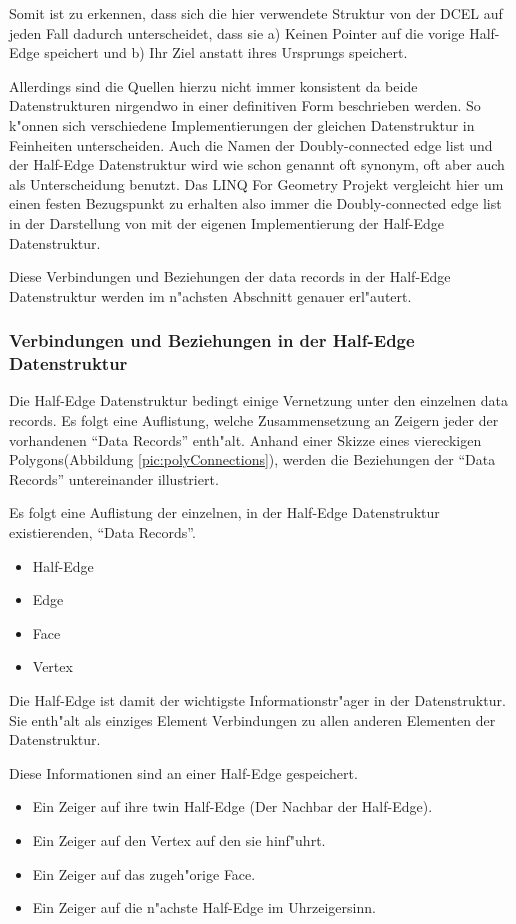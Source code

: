 \documentclass[pagesize, paper=a4, fontsize=12pt,titlepage=true, headings=small, headnosepline, abstractoff, liststotoc, nochapterprefix, plainheadsepline]{scrreprt}
\newcommand{\LFGS}{LINQ For Geometry }
\newcommand{\HES}{Half-Edge Datenstruktur }
\begin{document}
Somit ist zu erkennen, dass sich die hier verwendete Struktur von der DCEL auf jeden Fall dadurch unterscheidet, dass sie a) Keinen Pointer auf die vorige Half-Edge speichert und b) Ihr Ziel anstatt ihres Ursprungs speichert.

Allerdings sind die Quellen hierzu nicht immer konsistent da beide Datenstrukturen nirgendwo in einer definitiven Form beschrieben werden. So k"onnen sich verschiedene Implementierungen der gleichen Datenstruktur in Feinheiten unterscheiden. Auch die Namen der Doubly-connected edge list und der \HES wird wie schon genannt oft synonym, oft aber auch als Unterscheidung benutzt. Das \LFGS Projekt vergleicht hier um einen festen Bezugspunkt zu erhalten also immer die Doubly-connected edge list in der Darstellung von \cite[S.~30 und Folgende]{vanMarkdeBerg.2008} mit der eigenen Implementierung der Half-Edge Datenstruktur.

Diese Verbindungen und Beziehungen der data records in der \HES werden im n"achsten Abschnitt genauer erl"autert.

			\subsubsection {Verbindungen und Beziehungen in der \HES}
				Die \HES bedingt einige Vernetzung unter den einzelnen data records. Es folgt eine Auflistung, welche Zusammensetzung an Zeigern jeder der vorhandenen "`Data Records"' enth"alt.
Anhand einer Skizze eines viereckigen Polygons(Abbildung \ref{pic:polyConnections}), werden die Beziehungen der "`Data Records"' untereinander illustriert.
\newline

Es folgt eine Auflistung der einzelnen, in der \HES existierenden, "`Data Records"'.
\begin{itemize}
\item Half-Edge
\item Edge
\item Face
\item Vertex
\end{itemize}

Die Half-Edge ist damit der wichtigste Informationstr"ager in der Datenstruktur. Sie enth"alt als einziges Element Verbindungen zu allen anderen Elementen der Datenstruktur.

Diese Informationen sind an einer Half-Edge gespeichert.
\begin{itemize}
\item Ein Zeiger auf ihre twin Half-Edge (Der Nachbar der Half-Edge).
\item Ein Zeiger auf den Vertex auf den sie hinf"uhrt.
\item Ein Zeiger auf das zugeh"orige Face.
\item Ein Zeiger auf die n"achste Half-Edge im Uhrzeigersinn.
\end{itemize}
\end{document}
